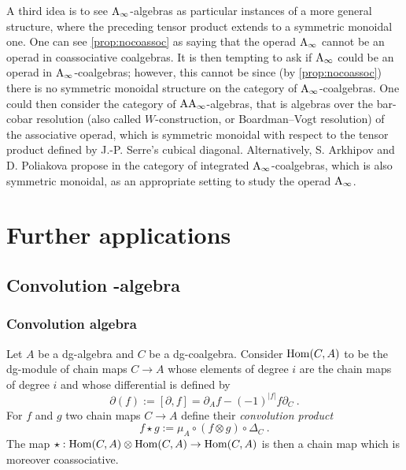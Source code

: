 \documentclass[twoside, 12pt]{amsart}
\theoremstyle{remark}
\begin{document}
A third idea is to see $\mathrm{A}_\infty$-algebras as particular instances of a more general structure, where the preceding tensor product extends to a symmetric monoidal one.  
One can see \cref{prop:nocoassoc} as saying that the operad $\mathrm{A}_\infty$ cannot be an operad in coassociative coalgebras. 
It is then tempting to ask if $\mathrm{A}_\infty$ could be an operad in $\mathrm{A}_\infty$-coalgebras; however, this cannot be since (by \cref{prop:nocoassoc}) there is no symmetric monoidal structure on the category of $\mathrm{A}_\infty$-coalgebras.
One could then consider the category of $\mathrm{AA}_\infty$-algebras, that is algebras over the bar-cobar resolution (also called $W$-construction, or Boardman--Vogt resolution) of the associative operad, which is symmetric monoidal with respect to the tensor product defined by J.-P. Serre's cubical diagonal. 
Alternatively, S. Arkhipov and D. Poliakova propose in \cite{PoliakovaArkhipov21} the category of integrated $\mathrm{A}_\infty$-coalgebras, which is also symmetric monoidal, as an appropriate setting to study the operad $\mathrm{A}_\infty$. 


\section{Further applications} \label{sec:furtherdirections}


\subsection{Convolution \Ainf -algebra}

\subsubsection{Convolution algebra}

Let $A$ be a dg-algebra and $C$ be a dg-coalgebra. 
Consider $\mathrm{Hom} (C,A)$ to be the dg-module of chain maps $C \rightarrow A$ whose elements of degree $i$ are the chain maps of degree $i$ and whose differential is defined by 
\[ \partial (f) := [ \partial , f ] = \partial_A f - (-1)^{|f|} f \partial_C \ . \]
For $f$ and $g$ two chain maps $C \rightarrow A$ define their \emph{convolution product}
\[ f \star g := \mu_A \circ ( f \otimes g) \circ \Delta_C \ . \]
The map $\star : \mathrm{Hom} (C,A) \otimes \mathrm{Hom} (C,A) \rightarrow \mathrm{Hom} (C,A)$ is then a chain map which is moreover coassociative.
\end{document}
